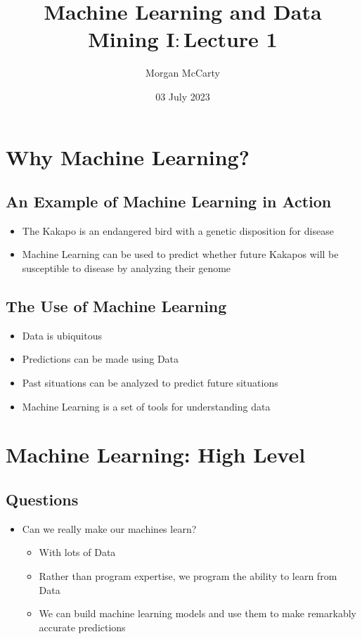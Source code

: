 \documentclass[12pt]{article}
\title{Machine Learning and Data Mining I$\colon$Lecture 1}
\author{Morgan McCarty}
\date{03 July 2023}
\begin{document}
    \maketitle

    \section{Why Machine Learning?}
        \subsection{An Example of Machine Learning in Action}
            \begin{itemize}
                \item The Kakapo is an endangered bird with a genetic disposition for disease
                \item Machine Learning can be used to predict whether future Kakapos will be susceptible to disease by analyzing their genome
            \end{itemize}
        \subsection{The Use of Machine Learning}
            \begin{itemize}
                \item Data is ubiquitous
                \item Predictions can be made using Data
                \item Past situations can be analyzed to predict future situations
                \item Machine Learning is a set of tools for understanding data
            \end{itemize}
    \section{Machine Learning: High Level}
        \subsection{Questions}
            \begin{itemize}
                \item Can we really make our machines learn?
                \begin{itemize}
                    \item With lots of Data
                    \item Rather than program expertise, we program the ability to learn from Data
                    \item We can build machine learning models and use them to make remarkably accurate predictions
                \end{itemize}
            \end{itemize}
\end{document}
